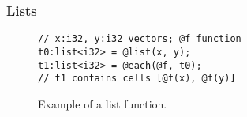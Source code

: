 \begin{comment}
\begin{table}[htbp]
\centering
\caption{Rules for Special boolean functions (B)} \label{rule_boolean}
\begin{small}
\begin{tabular}{|c||c|c|c|c|}
\hline
$F_{B}$(x,y)  & \multicolumn{4}{c|}{x} \\ \hline
y               & \shapeS & \shapeV{$c_0$} & \shapeV{$d_0$} & \shapeVS{$a_0$} \\ \hline
\shapeS         & \shapeS  & \shapeV{$c_0$} & \shapeV{$d_0$} & \shapeVS{$a_0$} \\ 
\shapeV{$c_1$}  & \shapeS  & \shapeV{$c_0$} & \shapeV{$d_0$} & \shapeVS{$a_0$} \\ 
\shapeV{$d_1$}  & \shapeS  & \shapeV{$c_0$} & \shapeV{$d_0$} & \shapeVS{$a_0$} \\ 
\shapeVS{$a_1$} & \shapeS  & \shapeV{$c_0$} & \shapeV{$d_0$} & \shapeVS{$a_0$} \\ \hline
\end{tabular}
\end{small}
\end{table}
\end{comment}


\subsubsection{Lists}

\begin{figure}[htbp]
\begin{lstlisting}[language=HorseIR, frame=single, basicstyle=\footnotesize]
// x:i32, y:i32 vectors; @f function
t0:list<i32> = @list(x, y);
t1:list<i32> = @each(@f, t0);
// t1 contains cells [@f(x), @f(y)]
\end{lstlisting}
\vspace{-3mm}
\caption{Example of a list function.} \label{fig:list_function}
\end{figure}

